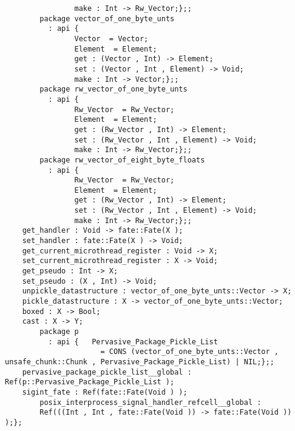 \begin{verbatim}
                make : Int -> Rw_Vector;};;
        package vector_of_one_byte_unts
          : api {
                Vector  = Vector;
                Element  = Element;
                get : (Vector , Int) -> Element;
                set : (Vector , Int , Element) -> Void;
                make : Int -> Vector;};;
        package rw_vector_of_one_byte_unts
          : api {
                Rw_Vector  = Rw_Vector;
                Element  = Element;
                get : (Rw_Vector , Int) -> Element;
                set : (Rw_Vector , Int , Element) -> Void;
                make : Int -> Rw_Vector;};;
        package rw_vector_of_eight_byte_floats
          : api {
                Rw_Vector  = Rw_Vector;
                Element  = Element;
                get : (Rw_Vector , Int) -> Element;
                set : (Rw_Vector , Int , Element) -> Void;
                make : Int -> Rw_Vector;};;
    get_handler : Void -> fate::Fate(X );
    set_handler : fate::Fate(X ) -> Void;
    get_current_microthread_register : Void -> X;
    set_current_microthread_register : X -> Void;
    get_pseudo : Int -> X;
    set_pseudo : (X , Int) -> Void;
    unpickle_datastructure : vector_of_one_byte_unts::Vector -> X;
    pickle_datastructure : X -> vector_of_one_byte_unts::Vector;
    boxed : X -> Bool;
    cast : X -> Y;
        package p
          : api {   Pervasive_Package_Pickle_List
                      = CONS (vector_of_one_byte_unts::Vector , unsafe_chunk::Chunk , Pervasive_Package_Pickle_List) | NIL;};;
    pervasive_package_pickle_list__global : Ref(p::Pervasive_Package_Pickle_List );
    sigint_fate : Ref(fate::Fate(Void ) );
        posix_interprocess_signal_handler_refcell__global :
        Ref(((Int , Int , fate::Fate(Void )) -> fate::Fate(Void )) );};
\end{verbatim}
